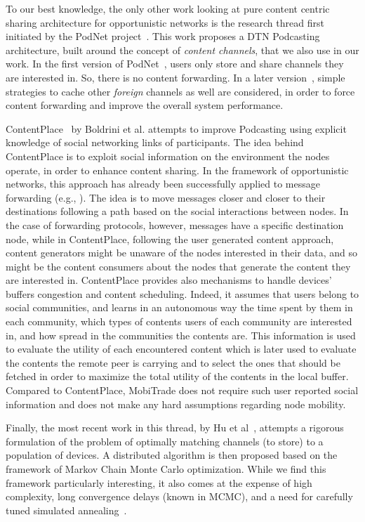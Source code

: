 To our best knowledge, the only other work looking at pure content centric sharing architecture for opportunistic networks is the research thread first initiated by the PodNet project~\cite{May07wirelessopportunistic, podnet07}. This work proposes a DTN Podcasting architecture, built around the concept of \emph{content channels}, that we also use in our work. In the first version of PodNet~\cite{May07wirelessopportunistic}, users only store and share channels they are interested in. So, there is no content forwarding. In a later version~\cite{podnet07}, simple strategies to cache other \emph{foreign} channels as well are considered, in order to force content forwarding and  improve the overall system performance. 
 
ContentPlace~\cite{ContentPlace} by Boldrini et al. attempts to improve Podcasting using explicit knowledge of social networking links of participants. The idea behind ContentPlace is to exploit social information on the environment the nodes operate, in order to enhance content sharing. In the framework of opportunistic networks, this approach has already been successfully applied to message forwarding (e.g., \cite{Boldrini:SocialForwarding}). The idea is to
move messages closer and closer to their destinations following a path based on the social interactions between nodes. In the case of forwarding protocols, however, messages have a specific destination node, while in ContentPlace, following the user generated content 
approach, content generators might be unaware of the nodes interested in their data, and so might be the content consumers about the
nodes that generate the content they are interested in. ContentPlace provides also mechanisms to handle devices' buffers congestion and content scheduling. Indeed, it assumes that users belong to social communities, and learns in an autonomous way the time
spent by them in each community, which types of contents users of each community are interested in, and how
spread in the communities the contents are. This information is used to evaluate the utility of each encountered
content which is later used to evaluate the contents the remote peer is carrying and to select the ones that should be fetched in order to maximize the total utility of the 
contents in the local buffer. Compared to ContentPlace, MobiTrade does not require such user reported social information and does not make any hard assumptions regarding node mobility. 
 
Finally, the most recent work in this thread, by Hu et al~\cite{OptimalChannelChoice}, attempts a rigorous formulation of the problem of optimally matching channels (to store) to a population of devices. A distributed algorithm is then proposed based on the framework of Markov Chain Monte Carlo optimization. While we find this framework particularly interesting, it also comes at the expense of high complexity, long convergence delays (known in MCMC), and a need for carefully tuned simulated annealing~\cite{mcmc-bremaud}.

